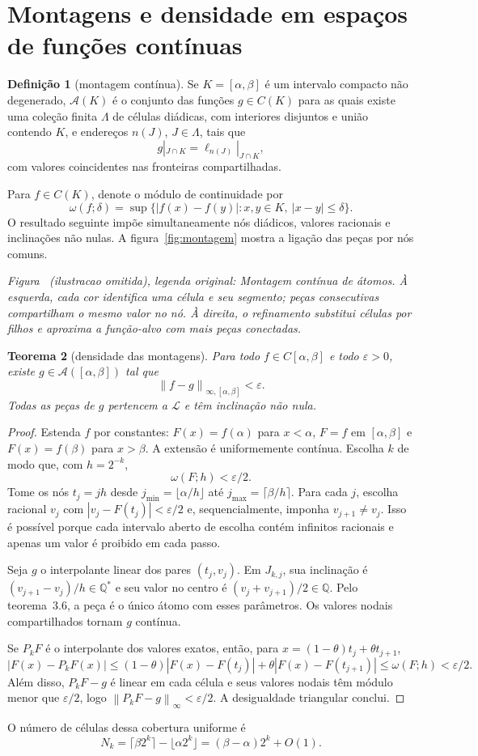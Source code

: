 \documentclass[11pt,a4paper]{article}
\theoremstyle{preciso}
\newtheorem{teorema}{Teorema}[section]
\theoremstyle{definition}
\newtheorem{definicao}[teorema]{Definição}
\newcommand{\Q}{\mathbb Q}
\newcommand{\LL}{\mathcal L}
\newcommand{\Asm}{\mathcal A}
\newcommand{\norm}[1]{\left\|#1\right\|_{\infty}}
\newcommand{\normK}[2]{\left\|#1\right\|_{\infty,#2}}
\newcommand{\eqn}[2]{\begin{equation}\label{eq:#1}#2\end{equation}}
\newcommand{\figura}[4]{\par\refstepcounter{figure}\label{fig:#4}\noindent\textit{Figura \thefigure~(ilustracao omitida), legenda original: #3}\par}
\begin{document}
\section{Montagens e densidade em espaços de funções contínuas}
\begin{definicao}[montagem contínua]
Se $K=[\alpha,\beta]$ é um intervalo compacto não degenerado, $\Asm(K)$ é o conjunto das funções $g\in C(K)$ para as quais existe uma coleção finita $\Lambda$ de células diádicas, com interiores disjuntos e união contendo $K$, e endereços $n(J)$, $J\in\Lambda$, tais que
\eqn{20}{g|_{J\cap K}=\ell_{n(J)}|_{J\cap K},}
com valores coincidentes nas fronteiras compartilhadas.
\end{definicao}
Para $f\in C(K)$, denote o módulo de continuidade por
\eqn{21}{\omega(f;\delta)=\sup\{|f(x)-f(y)|:x,y\in K,\ |x-y|\le\delta\}.}
O resultado seguinte impõe simultaneamente nós diádicos, valores racionais e inclinações não nulas. A figura~\ref{fig:montagem} mostra a ligação das peças por nós comuns.
\figura{03_montagem_continua}{1}{Montagem contínua de átomos. À esquerda, cada cor identifica uma célula e seu segmento; peças consecutivas compartilham o mesmo valor no nó. À direita, o refinamento substitui células por filhos e aproxima a função-alvo com mais peças conectadas.}{montagem}

\begin{teorema}[densidade das montagens]
Para todo $f\in C[\alpha,\beta]$ e todo $\varepsilon>0$, existe $g\in\Asm([\alpha,\beta])$ tal que
\[
\normK{f-g}{[\alpha,\beta]}<\varepsilon.
\]
Todas as peças de $g$ pertencem a $\LL$ e têm inclinação não nula.
\end{teorema}
\begin{proof}
Estenda $f$ por constantes: $F(x)=f(\alpha)$ para $x<\alpha$, $F=f$ em $[\alpha,\beta]$ e $F(x)=f(\beta)$ para $x>\beta$. A extensão é uniformemente contínua. Escolha $k$ de modo que, com $h=2^{-k}$,
\eqn{22}{\omega(F;h)<\varepsilon/2.}
Tome os nós $t_j=jh$ desde $j_{\min}=\lfloor\alpha/h\rfloor$ até $j_{\max}=\lceil\beta/h\rceil$. Para cada $j$, escolha racional $v_j$ com $|v_j-F(t_j)|<\varepsilon/2$ e, sequencialmente, imponha $v_{j+1}\ne v_j$. Isso é possível porque cada intervalo aberto de escolha contém infinitos racionais e apenas um valor é proibido em cada passo.

Seja $g$ o interpolante linear dos pares $(t_j,v_j)$. Em $J_{k,j}$, sua inclinação é $(v_{j+1}-v_j)/h\in\Q^*$ e seu valor no centro é $(v_j+v_{j+1})/2\in\Q$. Pelo teorema~3.6, a peça é o único átomo com esses parâmetros. Os valores nodais compartilhados tornam $g$ contínua.

Se $P_kF$ é o interpolante dos valores exatos, então, para $x=(1-\theta)t_j+\theta t_{j+1}$,
\[
|F(x)-P_kF(x)|\le(1-\theta)|F(x)-F(t_j)|+\theta|F(x)-F(t_{j+1})|
\le\omega(F;h)<\varepsilon/2.
\]
Além disso, $P_kF-g$ é linear em cada célula e seus valores nodais têm módulo menor que $\varepsilon/2$, logo $\norm{P_kF-g}<\varepsilon/2$. A desigualdade triangular conclui.
\end{proof}
O número de células dessa cobertura uniforme é
\eqn{23}{N_k=\lceil\beta2^k\rceil-\lfloor\alpha2^k\rfloor=(\beta-\alpha)2^k+O(1).}
\end{document}
